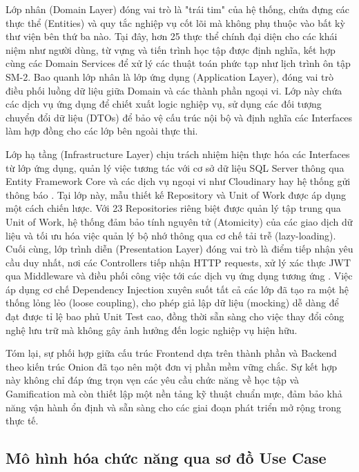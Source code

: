 \newpage
Lớp nhân (Domain Layer) đóng vai trò là "trái tim" của hệ thống, chứa đựng các thực thể (Entities) và quy tắc nghiệp vụ cốt lõi mà không phụ thuộc vào bất kỳ thư viện bên thứ ba nào. Tại đây, hơn 25 thực thể chính đại diện cho các khái niệm như người dùng, từ vựng và tiến trình học tập được định nghĩa, kết hợp cùng các Domain Services để xử lý các thuật toán phức tạp như lịch trình ôn tập SM-2. Bao quanh lớp nhân là lớp ứng dụng (Application Layer), đóng vai trò điều phối luồng dữ liệu giữa Domain và các thành phần ngoại vi. Lớp này chứa các dịch vụ ứng dụng để chiết xuất logic nghiệp vụ, sử dụng các đối tượng chuyển đổi dữ liệu (DTOs) để bảo vệ cấu trúc nội bộ và định nghĩa các Interfaces làm hợp đồng cho các lớp bên ngoài thực thi.

Lớp hạ tầng (Infrastructure Layer) chịu trách nhiệm hiện thực hóa các Interfaces từ lớp ứng dụng, quản lý việc tương tác với cơ sở dữ liệu SQL Server thông qua Entity Framework Core và các dịch vụ ngoại vi như Cloudinary hay hệ thống gửi thông báo \cite{MicrosoftEFCore2024}. Tại lớp này, mẫu thiết kế Repository và Unit of Work được áp dụng một cách chiến lược. Với 23 Repositories riêng biệt được quản lý tập trung qua Unit of Work, hệ thống đảm bảo tính nguyên tử (Atomicity) của các giao dịch dữ liệu và tối ưu hóa việc quản lý bộ nhớ thông qua cơ chế tải trễ (lazy-loading). Cuối cùng, lớp trình diễn (Presentation Layer) đóng vai trò là điểm tiếp nhận yêu cầu duy nhất, nơi các Controllers tiếp nhận HTTP requests, xử lý xác thực JWT qua Middleware và điều phối công việc tới các dịch vụ ứng dụng tương ứng \cite{MiddlewareDocs2024}. Việc áp dụng cơ chế Dependency Injection xuyên suốt tất cả các lớp đã tạo ra một hệ thống lỏng lẻo (loose coupling), cho phép giả lập dữ liệu (mocking) dễ dàng để đạt được tỉ lệ bao phủ Unit Test cao, đồng thời sẵn sàng cho việc thay đổi công nghệ lưu trữ mà không gây ảnh hưởng đến logic nghiệp vụ hiện hữu.

Tóm lại, sự phối hợp giữa cấu trúc Frontend dựa trên thành phần và Backend theo kiến trúc Onion đã tạo nên một đơn vị phần mềm vững chắc. Sự kết hợp này không chỉ đáp ứng trọn vẹn các yêu cầu chức năng về học tập và Gamification mà còn thiết lập một nền tảng kỹ thuật chuẩn mực, đảm bảo khả năng vận hành ổn định và sẵn sàng cho các giai đoạn phát triển mở rộng trong thực tế.

\subsection{Mô hình hóa chức năng qua sơ đồ Use Case}

